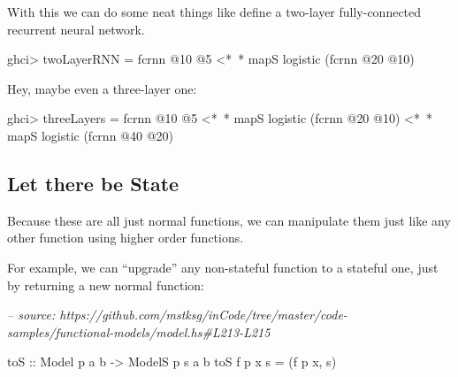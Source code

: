 \documentclass[]{article}
\newenvironment{Shaded}{}{}
\newcommand{\CommentTok}[1]{\textcolor[rgb]{0.38,0.63,0.69}{\textit{#1}}}
\newcommand{\DataTypeTok}[1]{\textcolor[rgb]{0.56,0.13,0.00}{#1}}
\newcommand{\DecValTok}[1]{\textcolor[rgb]{0.25,0.63,0.44}{#1}}
\newcommand{\FunctionTok}[1]{\textcolor[rgb]{0.02,0.16,0.49}{#1}}
\newcommand{\NormalTok}[1]{#1}
\newcommand{\OtherTok}[1]{\textcolor[rgb]{0.00,0.44,0.13}{#1}}
\begin{document}
With this we can do some neat things like define a two-layer fully-connected
recurrent neural network.

\begin{Shaded}
\begin{Highlighting}[]
\NormalTok{ghci}\FunctionTok{>}\NormalTok{ twoLayerRNN }\FunctionTok{=}\NormalTok{ fcrnn }\FunctionTok{@}\DecValTok{10} \FunctionTok{@}\DecValTok{5} \FunctionTok{<*~*}\NormalTok{ mapS logistic (fcrnn }\FunctionTok{@}\DecValTok{20} \FunctionTok{@}\DecValTok{10}\NormalTok{)}
\end{Highlighting}
\end{Shaded}

Hey, maybe even a three-layer one:

\begin{Shaded}
\begin{Highlighting}[]
\NormalTok{ghci}\FunctionTok{>}\NormalTok{ threeLayers }\FunctionTok{=}\NormalTok{ fcrnn }\FunctionTok{@}\DecValTok{10} \FunctionTok{@}\DecValTok{5}
               \FunctionTok{<*~*}\NormalTok{ mapS logistic (fcrnn }\FunctionTok{@}\DecValTok{20} \FunctionTok{@}\DecValTok{10}\NormalTok{)}
               \FunctionTok{<*~*}\NormalTok{ mapS logistic (fcrnn }\FunctionTok{@}\DecValTok{40} \FunctionTok{@}\DecValTok{20}\NormalTok{)}
\end{Highlighting}
\end{Shaded}

\hypertarget{let-there-be-state}{%
\subsection{Let there be State}\label{let-there-be-state}}

Because these are all just normal functions, we can manipulate them just like
any other function using higher order functions.

For example, we can ``upgrade'' any non-stateful function to a stateful one,
just by returning a new normal function:

\begin{Shaded}
\begin{Highlighting}[]
\CommentTok{-- source: https://github.com/mstksg/inCode/tree/master/code-samples/functional-models/model.hs#L213-L215}

\OtherTok{toS ::} \DataTypeTok{Model}\NormalTok{  p   a b}
    \OtherTok{->} \DataTypeTok{ModelS}\NormalTok{ p s a b}
\NormalTok{toS f p x s }\FunctionTok{=}\NormalTok{ (f p x, s)}
\end{Highlighting}
\end{Shaded}
\end{document}
